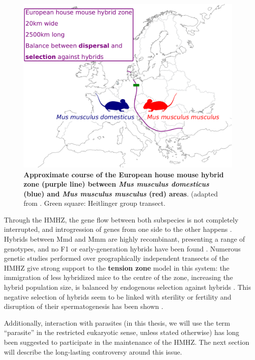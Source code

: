 \begin{figure}[H]
    \centering
    \includegraphics[width=.7\linewidth,height=\textheight,keepaspectratio]{images/1introduction/Figure1.pdf}
    \caption{\textbf{Approximate course of the European house mouse hybrid zone (purple line) between \textit{Mus musculus domesticus} (blue) and \textit{Mus musculus musculus} (red) areas}. (adapted from \cite{baird_where_2012}. Green square: Heitlinger group transect.}
\end{figure}

Through the HMHZ, the gene flow between both subspecies is not completely interrupted, and introgression of genes from one side to the other happens \citep{macholan_genetic_2007, macholan_assessing_2011, macholan_widespread_2019, raufaste_inferences_2005}. Hybrids between Mmd and Mmm are highly recombinant, presenting a range of genotypes, and no F1 or early-generation hybrids have been found \citep{macholan_genetic_2007}. Numerous genetic studies performed over geographically independent transects of the HMHZ \parencite[e.g.][]{macholan_genetic_2007, payseur_differential_2004, raufaste_inferences_2005} give strong support to the \textbf{tension zone} model in this system: the immigration of less hybridized mice to the centre of the zone, increasing the hybrid population size, is balanced by endogenous selection against hybrids \citep{baird_what_2012, barton_analysis_1985, boursot_evolution_1993}. This negative selection of hybrids seem to be linked with sterility or fertility \citep{baird_what_2012} and disruption of their spermatogenesis has been shown \citep{albrechtova_sperm-related_2012, martincova_sperm_2019, turner_reduced_2012, turner_genome-wide_2014}.
\par
Additionally, interaction with parasites (in this thesis, we will use the term “parasite” in the restricted eukaryotic sense, unless stated otherwise) has long been suggested to participate in the maintenance of the HMHZ. The next section will describe the long-lasting controversy around this issue.

